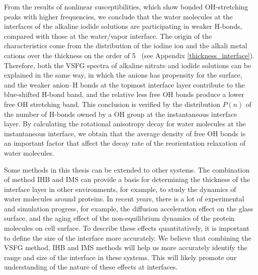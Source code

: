 From the results of nonlinear susceptibilities, which show bonded OH-stretching peaks with higher frequencies, 
we conclude that the water molecules at the interfaces of the alkaline iodide solutions are participating 
in weaker H-bonds, compared with those at the water/vapor interface. 
The origin of the characteristics come from the distribution of the iodine ion and the alkali metal cations
over the thickness on the order of 5 \A\ (see Appendix \ref{thickness_interface}).
Therefore, both the VSFG spectra of alkaline nitrate and iodide solutions can be explained in the same way, 
in which the anions has propensity for the surface, and the weaker anion--H bonds at the topmost interface layer contribute to the blue-shifted H-bond band,
and the relative less free OH bonds produce a lower free OH stretching band.
This conclusion is verified by the distribution $P(n)$ of the number of H-bonds owned by a OH group at the instantaneous interface layer. 
By calculating the rotational anisotropy decay for water molecules at the instantaneous interface, 
we obtain that the average density of free OH bonds is an important factor that affect the decay rate of the reorientation relaxation of water molecules.


Some methods in this thesis can be extended to other systems.
The combination of method IHB and IMS can provide a basis for determining the thickness of the interface layer in other environments, 
for example, to study the dynamics of water molecules around proteins. 
In recent years, there is a lot of experimental and simulation progress, for example, the diffusion acceleration effect on the glass surface\cite{ZhuL11,ZhangWei16}, 
and the aging effect of the non-equilibrium dynamics of the protein molecules on cell surface\cite{HuXiaohu16}. 
To describe these effects quantitatively, it is important to define the size of the interface more accurately. 
We believe that combining the VSFG method, IHB and IMS methods will help us more accurately identify the range and size of the interface in these systems.
This will likely promote our understanding of the nature of these effects at interfaces.


